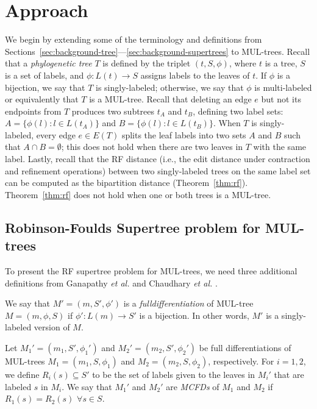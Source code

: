 \section{Approach}
\label{sec:fastmulrfs-approach}
We begin by extending some of the terminology and definitions from Sections~\ref{sec:background-tree}---\ref{sec:background-supertrees} to MUL-trees.
Recall that a {\em phylogenetic tree} $T$ is defined by the triplet $(t, S, \phi)$, where $t$ is a tree, $S$ is a set of labels, and $\phi: L(t) \rightarrow S$ assigns labels to the leaves of $t$.
If $\phi$ is a bijection, we say that $T$ is singly-labeled; otherwise, we say that $\phi$ is multi-labeled or equivalently that $T$ is a MUL-tree.
Recall that deleting an edge $e$ but not its endpoints from $T$ produces two  subtrees $t_A$ and $t_B$, defining two label sets: $A  = \{ \phi(l) : l \in L(t_A) \}$ and $B = \{ \phi(l) : l \in L(t_B) \}$.
When $T$ is singly-labeled, every edge $e \in E(T)$ splits the leaf labels into two sets $A$ and $B$ such that $A \cap B = \emptyset$; this does not hold when there are two leaves in $T$ with the same label.
Lastly, recall that the \gls{RF} distance (i.e., the edit distance under \gls{contraction} and \gls{refinement} operations) between two singly-labeled trees on the same label set can be computed as the bipartition distance (Theorem~\ref{thm:rf}).
Theorem~\ref{thm:rf} does not hold when one or both trees is a MUL-tree.

\subsection{Robinson-Foulds Supertree problem for MUL-trees}
To present the RF supertree problem for MUL-trees, we need three additional definitions
\clearpage
\noindent from Ganapathy {\em et al.} \cite{ganapathy2006pattern} and Chaudhary {\em et al.} \cite{chaudhary2013inferring}.

\begin{definition}
\label{defn:diff}
We say that $M' = (m, S', \phi')$ is a \emph{\gls{fulldifferentiation}} of MUL-tree $M = (m, \phi, S)$ if $\phi' : L(m) \rightarrow S'$ is a bijection. In other words, $M'$ is a singly-labeled version of $M$.
\end{definition}

\begin{definition}
\label{defn:mcsd}
Let $M_1' = (m_1, S', \phi_1')$ and $M_2' = (m_2, S', \phi_2')$ be full differentiations of MUL-trees $M_1 = (m_1, S, \phi_1)$ and $M_2  = (m_2, S, \phi_2)$, respectively.
For $i=1,2$, we define $R_i(s) \subseteq S'$ to be the set of labels given to the leaves in $M_i'$ that are labeled $s$ in $M_i$.
We say that $M_1'$ and $M_2'$ are \emph{\glspl{MCFD}} of $M_1$ and $M_2$ if $R_1(s) = R_2(s)$ $\forall s \in S$.
\end{definition}

